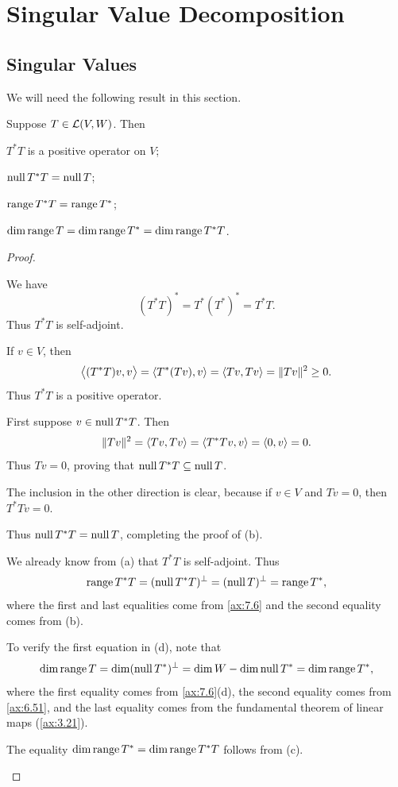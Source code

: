 \iftestbuild %
\setcounter{section}{4}\setcounter{theorem}{63}
\fi %
\DeclareRobustCommand\axeqno{\refstepcounter{theorem}\tag*{\thetheorem}}
\section{Singular Value Decomposition}

\subsection{Singular Values}

We will need the following result in this section.

\begin{result}[Properties of $T^*T$]\label{ax:7.64}
Suppose $T\in\mathcal{L}(V,W)$. Then
\begin{parts}
\item $T^*T$ is a positive operator on $V$;
\item $\operatorname{null} T^*T=\operatorname{null} T$;
\item $\operatorname{range} T^*T=\operatorname{range} T^*$;
\item $\operatorname{dim}\operatorname{range} T=\operatorname{dim}\operatorname{range} T^*=\operatorname{dim}\operatorname{range} T^*T$.
\end{parts}
\end{result}

\begin{proof}\leavevmode
\begin{parts}
\item We have
  \[ (T^*T)^* = T^*(T^*)^* = T^*T. \]
  Thus $T^*T$ is self-adjoint.

  If $v\in V$, then
  \[ \bigl\langle (T^*T)v, v\bigr\rangle = \langle T^*(Tv), v \rangle = \langle Tv, Tv \rangle
     = \lVert Tv \rVert^2 \ge 0. \]
  Thus $T^*T$ is a positive operator.
\item First suppose $v\in\operatorname{null} T^*T$. Then
  \[ \lVert Tv \rVert^2 = \langle Tv, Tv \rangle = \langle T^*Tv, v \rangle = \langle 0, v \rangle = 0. \]
  Thus $Tv=0$, proving that $\operatorname{null} T^*T\subseteq\operatorname{null} T$.

  The inclusion in the other direction is clear, because if $v\in V$ and
  $Tv=0$, then $T^*Tv=0$.

  Thus $\operatorname{null} T^*T=\operatorname{null} T$, completing the proof of (b).
\item We already know from (a) that $T^*T$ is self-adjoint. Thus
  \[ \operatorname{range} T^*T = (\operatorname{null} T^*T)^\perp = (\operatorname{null} T)^\perp = \operatorname{range} T^*, \]
  where the first and last equalities come from \ref{ax:7.6} and the second
  equality comes from (b).
\item To verify the first equation in (d), note that
  \[ \operatorname{dim}\operatorname{range} T = \operatorname{dim}(\operatorname{null} T^*)^\perp = \operatorname{dim} W-\operatorname{dim}\operatorname{null} T^* = \operatorname{dim}\operatorname{range} T^*, \]
  where the first equality comes from \ref{ax:7.6}(d), the second equality
  comes from \ref{ax:6.51}, and the last equality comes from the fundamental
  theorem of linear maps (\ref{ax:3.21}).

  The equality $\operatorname{dim}\operatorname{range} T^*=\operatorname{dim}\operatorname{range} T^*T$ follows from (c).\qedhere
\end{parts}
\end{proof}

